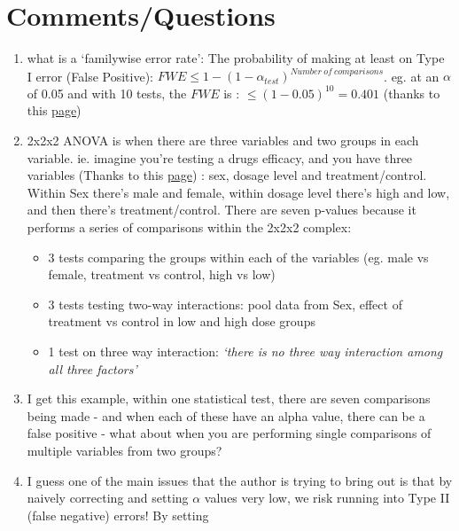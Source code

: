 \documentclass[
]{book}
\providecommand{\tightlist}{%
  \setlength{\itemsep}{0pt}\setlength{\parskip}{0pt}}
\begin{document}
\hypertarget{lakens_com}{%
\section{Comments/Questions}\label{lakens_com}}

\begin{enumerate}
\def\labelenumi{\arabic{enumi}.}
\tightlist
\item
  what is a `familywise error rate': The probability of making at least on Type I error (False Positive): \(FWE \leq 1-(1-\alpha_{test})^{Number\ of\ comparisons}\). eg. at an \(\alpha\) of 0.05 and with 10 tests, the \(FWE\) is : \(\leq (1-0.05)^{10}=0.401\) (thanks to this \href{https://www.statisticshowto.com/familywise-error-rate/}{page})
\item
  2x2x2 ANOVA is when there are three variables and two groups in each variable. ie. imagine you're testing a drugs efficacy, and you have three variables (Thanks to this \href{https://www.graphpad.com/guides/prism/7/statistics/stat_what_is_three-way_anova_used_f.htm}{page}) : sex, dosage level and treatment/control. Within Sex there's male and female, within dosage level there's high and low, and then there's treatment/control. There are seven p-values because it performs a series of comparisons within the 2x2x2 complex:

  \begin{itemize}
  \tightlist
  \item
    3 tests comparing the groups within each of the variables (eg. male vs female, treatment vs control, high vs low)
  \item
    3 tests testing two-way interactions: pool data from Sex, effect of treatment vs control in low and high dose groups
  \item
    1 test on three way interaction: \emph{`there is no three way interaction among all three factors'}
  \end{itemize}
\item
  I get this example, within one statistical test, there are seven comparisons being made - and when each of these have an alpha value, there can be a false positive - what about when you are performing single comparisons of multiple variables from two groups?
\item
  I guess one of the main issues that the author is trying to bring out is that by naively correcting and setting \(\alpha\) values very low, we risk running into Type II (false negative) errors! By setting
\end{enumerate}
\end{document}
